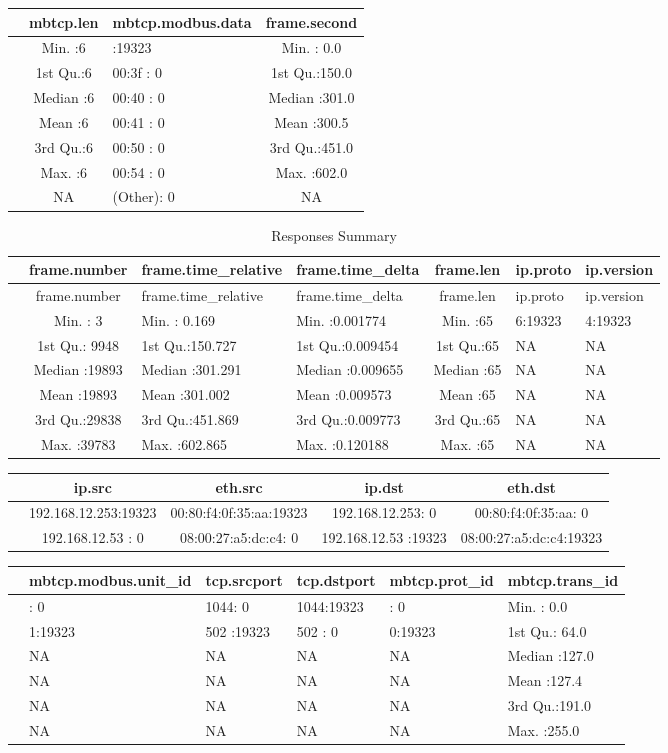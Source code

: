 \documentclass[11pt,a4paper]{article}
\begin{document}
\begin{longtable}[c]{@{}lclc@{}}
\toprule
& mbtcp.len & mbtcp.modbus.data & frame.second\tabularnewline
\midrule
\endhead
& Min. :6 & :19323 & Min. : 0.0\tabularnewline
& 1st Qu.:6 & 00:3f : 0 & 1st Qu.:150.0\tabularnewline
& Median :6 & 00:40 : 0 & Median :301.0\tabularnewline
& Mean :6 & 00:41 : 0 & Mean :300.5\tabularnewline
& 3rd Qu.:6 & 00:50 : 0 & 3rd Qu.:451.0\tabularnewline
& Max. :6 & 00:54 : 0 & Max. :602.0\tabularnewline
& NA & (Other): 0 & NA\tabularnewline
\bottomrule
\end{longtable}

\newpage

\begin{longtable}[c]{@{}lcllcll@{}}
\caption{Responses Summary}\tabularnewline
\toprule
& frame.number & frame.time\_relative & frame.time\_delta & frame.len &
ip.proto & ip.version\tabularnewline
\midrule
\endfirsthead
\toprule
& frame.number & frame.time\_relative & frame.time\_delta & frame.len &
ip.proto & ip.version\tabularnewline
\midrule
\endhead
& Min. : 3 & Min. : 0.169 & Min. :0.001774 & Min. :65 & 6:19323 &
4:19323\tabularnewline
& 1st Qu.: 9948 & 1st Qu.:150.727 & 1st Qu.:0.009454 & 1st Qu.:65 & NA &
NA\tabularnewline
& Median :19893 & Median :301.291 & Median :0.009655 & Median :65 & NA &
NA\tabularnewline
& Mean :19893 & Mean :301.002 & Mean :0.009573 & Mean :65 & NA &
NA\tabularnewline
& 3rd Qu.:29838 & 3rd Qu.:451.869 & 3rd Qu.:0.009773 & 3rd Qu.:65 & NA &
NA\tabularnewline
& Max. :39783 & Max. :602.865 & Max. :0.120188 & Max. :65 & NA &
NA\tabularnewline
\bottomrule
\end{longtable}

\begin{longtable}[c]{@{}lcccc@{}}
\toprule
& ip.src & eth.src & ip.dst & eth.dst\tabularnewline
\midrule
\endhead
& 192.168.12.253:19323 & 00:80:f4:0f:35:aa:19323 & 192.168.12.253: 0 &
00:80:f4:0f:35:aa: 0\tabularnewline
& 192.168.12.53 : 0 & 08:00:27:a5:dc:c4: 0 & 192.168.12.53 :19323 &
08:00:27:a5:dc:c4:19323\tabularnewline
\bottomrule
\end{longtable}

\begin{longtable}[c]{@{}llllll@{}}
\toprule
& mbtcp.modbus.unit\_id & tcp.srcport & tcp.dstport & mbtcp.prot\_id &
mbtcp.trans\_id\tabularnewline
\midrule
\endhead
& : 0 & 1044: 0 & 1044:19323 & : 0 & Min. : 0.0\tabularnewline
& 1:19323 & 502 :19323 & 502 : 0 & 0:19323 & 1st Qu.:
64.0\tabularnewline
& NA & NA & NA & NA & Median :127.0\tabularnewline
& NA & NA & NA & NA & Mean :127.4\tabularnewline
& NA & NA & NA & NA & 3rd Qu.:191.0\tabularnewline
& NA & NA & NA & NA & Max. :255.0\tabularnewline
\bottomrule
\end{longtable}
\end{document}
